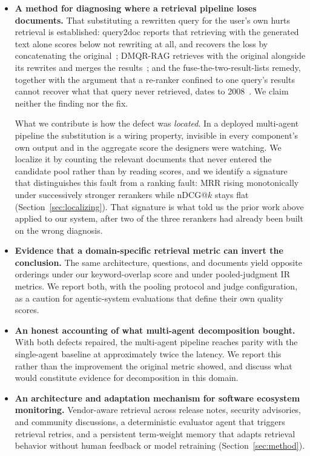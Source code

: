 \documentclass[acmsmall,review,anonymous,screen]{acmart}
\begin{document}
\begin{itemize}
  \item \textbf{A method for diagnosing where a retrieval pipeline loses
  documents.} That substituting a rewritten query for the user's own hurts
  retrieval is established: query2doc reports that retrieving with the generated
  text alone scores below not rewriting at all, and recovers the loss by
  concatenating the original~\cite{wang2023query2doc}; DMQR-RAG retrieves with
  the original alongside its rewrites and merges the
  results~\cite{gao2024dmqr}; and the fuse-the-two-result-lists remedy, together
  with the argument that a re-ranker confined to one query's results cannot
  recover what that query never retrieved, dates to
  2008~\cite{zighelnic2008drift}. We claim neither the finding nor the fix.

  What we contribute is how the defect was \emph{located}. In a deployed
  multi-agent pipeline the substitution is a wiring property, invisible in every
  component's own output and in the aggregate score the designers were watching.
  We localize it by counting the relevant documents that never entered the
  candidate pool rather than by reading scores, and we identify a signature that
  distinguishes this fault from a ranking fault: MRR rising monotonically under
  successively stronger rerankers while nDCG@$k$ stays flat
  (Section~\ref{sec:localizing}). That signature is what told us the prior work
  above applied to our system, after two of the three rerankers had already been
  built on the wrong diagnosis.

  \item \textbf{Evidence that a domain-specific retrieval metric can invert the
  conclusion.} The same architecture, questions, and documents yield opposite
  orderings under our keyword-overlap score and under pooled-judgment IR
  metrics. We report both, with the pooling protocol and judge configuration, as
  a caution for agentic-system evaluations that define their own quality scores.

  \item \textbf{An honest accounting of what multi-agent decomposition bought.}
  With both defects repaired, the multi-agent pipeline reaches parity with the
  single-agent baseline at approximately twice the latency. We report this
  rather than the improvement the original metric showed, and discuss what would
  constitute evidence for decomposition in this domain.

  \item \textbf{An architecture and adaptation mechanism for software ecosystem
  monitoring.} Vendor-aware retrieval across release notes, security advisories,
  and community discussions, a deterministic evaluator agent that triggers
  retrieval retries, and a persistent term-weight memory that adapts retrieval
  behavior without human feedback or model retraining (Section~\ref{sec:method}).


\end{itemize}
\end{document}
